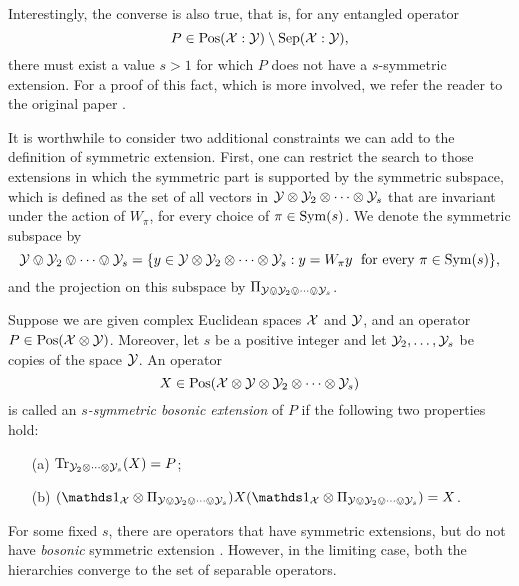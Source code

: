 Interestingly, the converse is also true, that is, for any entangled operator 
\begin{equation}
P \in \mathrm{Pos}(\mathcal{X}:\mathcal{Y}) \setminus \mathrm{Sep}(\mathcal{X}:\mathcal{Y}),
\end{equation}
there must exist a value $s > 1$ for which $P$ does not have a $s$-symmetric 
extension. For a proof of this fact, which is more involved, we refer the 
reader to the original paper \cite{Doherty02}.

It is worthwhile to consider two additional constraints we can add to the 
definition of symmetric extension. 
First, one can restrict the search to those extensions in which the symmetric part
is supported by the symmetric subspace, 
which is defined as the set of all vectors in $\mathcal{Y}\otimes\mathcal{Y}_{2}\otimes\cdots\otimes\mathcal{Y}_{s}$
that are invariant under the action of $W_{\pi}$, for every choice of $\pi\in\mathrm{Sym}(s)$.
We denote the symmetric subspace by
\begin{equation}
  \mathcal{Y}\ovee\mathcal{Y}_{2}\ovee\cdots\ovee\mathcal{Y}_{s} = \{ y \in \mathcal{Y}\otimes\mathcal{Y}_{2}\otimes\cdots\otimes\mathcal{Y}_{s}
    : y = W_{\pi}y \;\mbox{ for every $\pi\in\mathrm{Sym}(s)$} \},
\end{equation}
and the projection on this subspace by $\Pi_{\mathcal{Y}\ovee\mathcal{Y}_{2}\ovee\cdots\ovee\mathcal{Y}_{s}}$.

\begin{definition}
\label{def:bosonic}
  Suppose we are given complex Euclidean spaces $\mathcal{X}$ and $\mathcal{Y}$, and an operator
  $P\in\mathrm{Pos}(\mathcal{X}\otimes\mathcal{Y})$. Moreover, let $s$ be a positive integer and let 
  $\mathcal{Y}_{2},\ldots,\mathcal{Y}_{s}$ be copies of the space $\mathcal{Y}$. An operator 
  \begin{equation}
    X \in \mathrm{Pos}(\mathcal{X}\otimes\mathcal{Y}\otimes\mathcal{Y}_{2}\otimes\cdots\otimes\mathcal{Y}_{s})
  \end{equation}
  is called an \emph{$s$-symmetric bosonic extension} of $P$ if the following 
  two properties hold:
  \begin{itemize}
    \item[(a)] $\operatorname{Tr}_{\mathcal{Y}_{2}\otimes\cdots\otimes\mathcal{Y}_{s}}(X) = P$;
    \item[(b)] $(\I_{\X}\otimes \Pi_{\Y\ovee\Y_{2}\ovee\cdots\ovee\Y_{s}})X
                (\I_{\X}\otimes \Pi_{\Y\ovee\Y_{2}\ovee\cdots\ovee\Y_{s}}) = X$.
  \end{itemize}
\end{definition}

For some fixed $s$, there are operators that have symmetric extensions, 
but do not have \emph{bosonic} symmetric extension \cite{Myhr09}.
However, in the limiting case, both the hierarchies converge to the set of separable operators.


